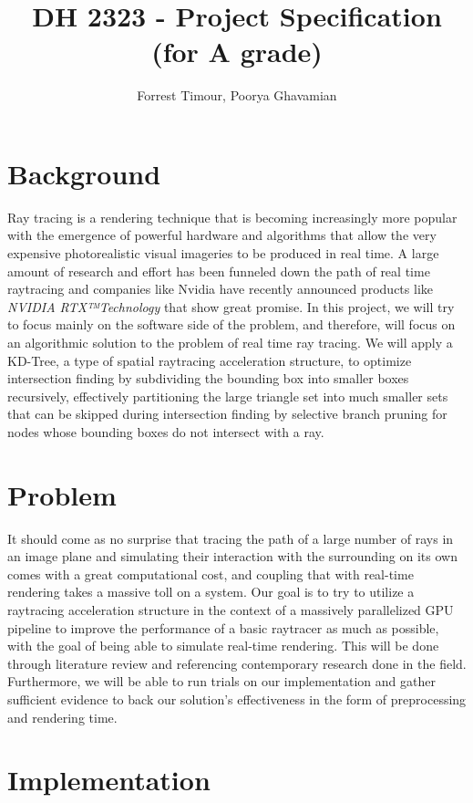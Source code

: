 \documentclass{article}
\title{DH 2323 - Project Specification (for A grade)}
\author{Forrest Timour, Poorya Ghavamian}
\begin{document}
\maketitle

\section*{Background}
Ray tracing is a rendering technique that is becoming increasingly more popular with the emergence of powerful hardware and algorithms that allow the very expensive photorealistic visual imageries to be produced in real time. A large amount of research and effort has been funneled down the path of real time raytracing and companies like Nvidia have recently announced products like \textit{NVIDIA RTX™Technology} that show great promise. In this project, we will try to focus mainly on the software side of the problem, and therefore, will focus on an algorithmic solution to the problem of real time ray tracing. We will apply a KD-Tree, a type of spatial raytracing acceleration structure, to optimize intersection finding by subdividing the bounding box into smaller boxes recursively, effectively partitioning the large triangle set into much smaller sets that can be skipped during intersection finding by selective branch pruning for nodes whose bounding boxes do not intersect with a ray. 

\section*{Problem}
It should come as no surprise that tracing the path of a large number of rays in an image plane and simulating their interaction with the surrounding on its own comes with a great computational cost, and coupling that with real-time rendering takes a massive toll on a system. Our goal is to try to utilize a raytracing acceleration structure in the context of a massively parallelized GPU pipeline to improve the performance of a basic raytracer as much as possible, with the goal of being able to simulate real-time rendering. This will be done through literature review and referencing contemporary research done in the field. Furthermore, we will be able to run trials on our implementation and gather sufficient evidence to back our solution’s effectiveness in the form of preprocessing and rendering time.

\section*{Implementation}
\end{document}
